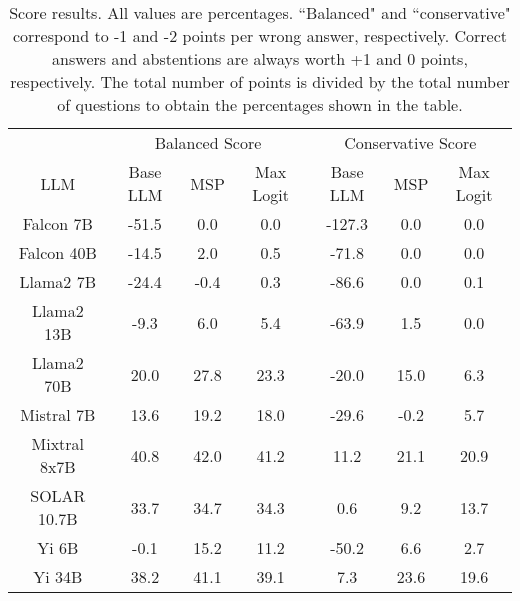 \begin{table*}
\centering
\begin{tabular}{c|c|c|c|c|c|c}
& \multicolumn{3}{c|}{Balanced Score} & \multicolumn{3}{c}{Conservative Score} \\ 
LLM & Base LLM & MSP & Max Logit & Base LLM & MSP & Max Logit\\ \hline
Falcon 7B & -51.5 & 0.0 & 0.0 & -127.3 & 0.0 & 0.0\\
Falcon 40B & -14.5 & 2.0 & 0.5 & -71.8 & 0.0 & 0.0\\
Llama2 7B & -24.4 & -0.4 & 0.3 & -86.6 & 0.0 & 0.1\\
Llama2 13B & -9.3 & 6.0 & 5.4 & -63.9 & 1.5 & 0.0\\
Llama2 70B & 20.0 & 27.8 & 23.3 & -20.0 & 15.0 & 6.3\\
Mistral 7B & 13.6 & 19.2 & 18.0 & -29.6 & -0.2 & 5.7\\
Mixtral 8x7B & 40.8 & 42.0 & 41.2 & 11.2 & 21.1 & 20.9\\
SOLAR 10.7B & 33.7 & 34.7 & 34.3 & 0.6 & 9.2 & 13.7\\
Yi 6B & -0.1 & 15.2 & 11.2 & -50.2 & 6.6 & 2.7\\
Yi 34B & 38.2 & 41.1 & 39.1 & 7.3 & 23.6 & 19.6\\
\hline
\end{tabular}
\caption{Score results. All values are percentages. ``Balanced" and ``conservative" correspond to -1 and -2 points per wrong answer, respectively. Correct answers and abstentions are always worth +1 and 0 points, respectively. The total number of points is divided by the total number of questions to obtain the percentages shown in the table.}
\label{tab:score}
\end{table*}
